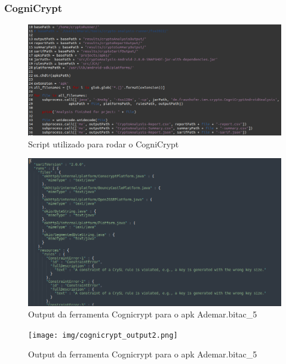 \subsubsection{CogniCrypt}

\begin{figure}[!ht]
  \centering
  \includegraphics[scale=0.4]{img/cognicrypt_script.png}
  \caption{Script utilizado para rodar o CogniCrypt}
  \label{img: cognicrypt_script}
\end{figure}

\FloatBarrier

\begin{figure}[!ht]
  \centering
  \includegraphics[scale=0.4]{img/cognicrypt_output.png}
  \caption{Output da ferramenta Cognicrypt para o apk Ademar.bitac\_5}
  \label{img: cognicrypt_output}
\end{figure}

\FloatBarrier

\begin{figure}[!ht]
  \centering
  \texttt{[image: img/cognicrypt\_output2.png]}
  \caption{Output da ferramenta Cognicrypt para o apk Ademar.bitac\_5}
  \label{img: cognicrypt_output2}
\end{figure}

